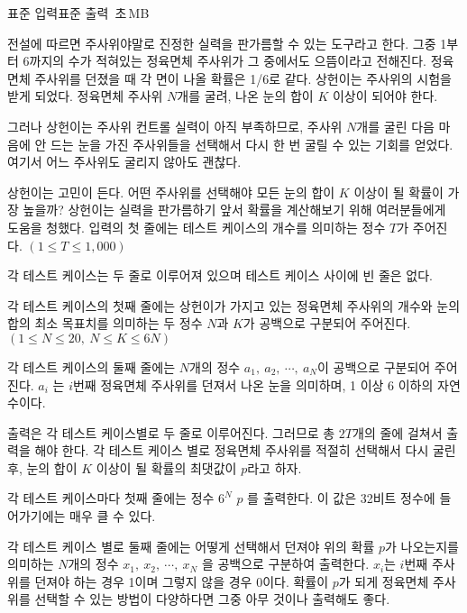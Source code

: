 \begin{problem}{\kcpcdicetitle}
    {표준 입력}{표준 출력}
    {\kcpcdicetime\,초}{\kcpcdicememory\,MB}{}{\kcpcdicescore}
    
    전설에 따르면 주사위야말로 진정한 실력을 판가름할 수 있는 도구라고 한다. 그중 1부터 6까지의 수가 적혀있는 정육면체 주사위가 그 중에서도 으뜸이라고 전해진다. 정육면체 주사위를 던졌을 때 각 면이 나올 확률은 1/6로 같다. 상헌이는 주사위의 시험을 받게 되었다. 정육면체 주사위 $ N $개를 굴려, 나온 눈의 합이 $ K $ 이상이 되어야 한다.
    
    그러나 상헌이는 주사위 컨트롤 실력이 아직 부족하므로, 주사위 $ N $개를 굴린 다음 마음에 안 드는 눈을 가진 주사위들을 선택해서 다시 한 번 굴릴 수 있는 기회를 얻었다. 여기서 어느 주사위도 굴리지 않아도 괜찮다.
    
    상헌이는 고민이 든다. 어떤 주사위를 선택해야 모든 눈의 합이 $ K $ 이상이 될 확률이 가장 높을까? 상헌이는 실력을 판가름하기 앞서 확률을 계산해보기 위해 여러분들에게 도움을 청했다.
    \InputFile
    입력의 첫 줄에는 테스트 케이스의 개수를 의미하는 정수 $ T $가 주어진다. $ (1 \leq T \leq 1,000) $
    
    각 테스트 케이스는 두 줄로 이루어져 있으며 테스트 케이스 사이에 빈 줄은 없다.
    
    각 테스트 케이스의 첫째 줄에는 상헌이가 가지고 있는 정육면체 주사위의 개수와 눈의 합의 최소 목표치를 의미하는 두 정수 $ N $과 $ K $가 공백으로 구분되어 주어진다. $ (1 \leq N \leq 20,\ N \leq K \leq 6N) $
    
    각 테스트 케이스의 둘째 줄에는 $ N $개의 정수 $ a_1,\ a_2,\ \cdots,\ a_N $이 공백으로 구분되어 주어진다. $ a_i $ 는 $ i $번째 정육면체 주사위를 던져서 나온 눈을 의미하며, 1 이상 6 이하의 자연수이다.
    
    \OutputFile
    출력은 각 테스트 케이스별로 두 줄로 이루어진다. 그러므로 총 $ 2T $개의 줄에 걸쳐서 출력을 해야 한다. 각 테스트 케이스 별로 정육면체 주사위를 적절히 선택해서 다시 굴린 후, 눈의 합이 $ K $ 이상이 될 확률의 최댓값이 $ p $라고 하자.
    
    각 테스트 케이스마다 첫째 줄에는 정수 $ 6^N $\,\texttimes\,$ p $ 를 출력한다. 이 값은 32비트 정수에 들어가기에는 매우 클 수 있다.
    
    각 테스트 케이스 별로 둘째 줄에는 어떻게 선택해서 던져야 위의 확률 $ p $가 나오는지를 의미하는 $ N $개의 정수 $ x_1,\ x_2,\ \cdots,\ x_N $ 을 공백으로 구분하여 출력한다. $ x_i $는 $ i $번째 주사위를 던져야 하는 경우 1이며 그렇지 않을 경우 0이다. 확률이 $ p $가 되게 정육면체 주사위를 선택할 수 있는 방법이 다양하다면 그중 아무 것이나 출력해도 좋다.
    

\end{problem}
